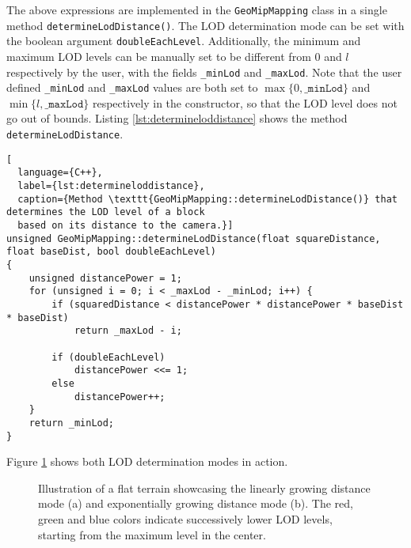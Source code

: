 The above expressions are implemented in the \texttt{GeoMipMapping} class in a single method \texttt{determineLodDistance()}.
The LOD determination mode can be set with the boolean argument \texttt{doubleEachLevel}.
Additionally, the minimum and maximum LOD levels can be manually set to be different from 0 and $l$ respectively 
by the user, with the fields \texttt{\_minLod} and \texttt{\_maxLod}. 
Note that the user defined \texttt{\_minLod} and \texttt{\_maxLod} values
are both set to $\max\{0,\texttt{\_minLod}\}$ and $\min\{l,\texttt{\_maxLod}\}$ respectively in the constructor, 
so that the LOD level does not go out of bounds.
Listing \ref{lst:determineloddistance} shows the method \texttt{determineLodDistance}.

\begin{lstlisting}[
  language={C++},
  label={lst:determineloddistance},
  caption={Method \texttt{GeoMipMapping::determineLodDistance()} that determines the LOD level of a block 
  based on its distance to the camera.}]
unsigned GeoMipMapping::determineLodDistance(float squareDistance, float baseDist, bool doubleEachLevel)
{
    unsigned distancePower = 1;
    for (unsigned i = 0; i < _maxLod - _minLod; i++) {
        if (squaredDistance < distancePower * distancePower * baseDist * baseDist)
            return _maxLod - i;

        if (doubleEachLevel)
            distancePower <<= 1;
        else
            distancePower++;
    }
    return _minLod;
}
\end{lstlisting}

Figure \ref{fig:atlod-lin-exp} shows both LOD determination modes in action.
\begin{figure}[H]
  \centering
  \qquad
  \caption{Illustration of a flat terrain showcasing the linearly growing distance mode (a) and exponentially growing distance mode (b). The red, green and blue colors indicate successively lower LOD levels, starting from the maximum level in the center.}\label{fig:atlod-lin-exp}
\end{figure}

